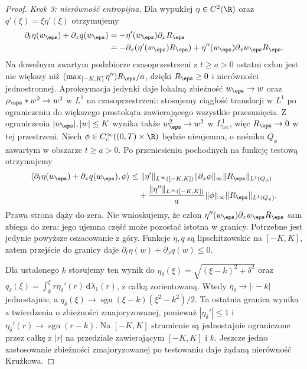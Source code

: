\begin{proof}
\emph{Krok 3: nierówność entropijna.}
Dla wypukłej $\eta\in C^2(\R)$ oraz
$q'(\xi)=\xi\eta'(\xi)$ otrzymujemy
\[
 \begin{split}
 \partial_t\eta(w_\eps)+\partial_xq(w_\eps)
 &=-\eta'(w_\eps)\partial_xR_\eps\\
 &=-\partial_x(\eta'(w_\eps)R_\eps)
       +\eta''(w_\eps)\partial_xw_\eps R_\eps.
 \end{split}
\]
Na dowolnym zwartym podzbiorze czasoprzestrzeni
z $t\ge a>0$ ostatni człon jest nie większy
niż $(\max_{[-K,K]}\eta'')R_\eps/a$, dzięki
$R_\eps\ge0$ i nierówności jednostronnej.
Aproksymacja jedynki daje lokalną zbieżność
$w_\eps\to w$ oraz $\rho_\eps*w^2\to w^2$
w $L^1$ na czasoprzestrzeni: stosujemy
ciągłość translacji w $L^1$ po ograniczeniu
do większego prostokąta zawierającego
wszystkie przesunięcia.
Z ograniczenia $|w_\eps|,|w|\le K$ wynika
także $w_\eps^2\to w^2$ w $L^1_{\mathrm{loc}}$,
więc $R_\eps\to0$ w tej przestrzeni.
Niech $\phi\in C_c^\infty((0,T)\times\R)$
będzie nieujemna, o nośniku $Q_\phi$ zawartym
w obszarze $t\ge a>0$. Po przeniesieniu pochodnych
na funkcję testową otrzymujemy
\[
 \begin{split}
 \langle\partial_t\eta(w_\eps)+\partial_xq(w_\eps),\phi\rangle
 &\le \|\eta'\|_{L^\infty([-K,K])}
         \|\partial_x\phi\|_\infty\|R_\eps\|_{L^1(Q_\phi)}\\
 &\quad+\frac{\|\eta''\|_{L^\infty([-K,K])}}{a}
         \|\phi\|_\infty\|R_\eps\|_{L^1(Q_\phi)}.
 \end{split}
\]
Prawa strona dąży do zera. Nie wnioskujemy,
że człon $\eta''(w_\eps)\partial_xw_\eps R_\eps$
sam zbiega do zera: jego ujemna część może
pozostać istotna w granicy. Potrzebne jest
jedynie powyższe oszacowanie z góry.
Funkcje $\eta,q$ są lipschitzowskie na $[-K,K]$,
zatem przejście do granicy daje
$\partial_t\eta(w)+\partial_xq(w)\le0$.

Dla ustalonego $k$ stosujemy ten wynik do
$\eta_\delta(\xi)=\sqrt{(\xi-k)^2+\delta^2}$ oraz
$q_\delta(\xi)=\int_k^\xi r\eta_\delta'(r)\,
\mathrm d\lambda_1(r)$, z całką zorientowaną.
Wtedy $\eta_\delta\to|\cdot-k|$ jednostajnie,
a $q_\delta(\xi)\to
\operatorname{sgn}(\xi-k)(\xi^2-k^2)/2$.
Ta ostatnia granica wynika z twierdzenia
o zbieżności zmajoryzowanej, ponieważ
$|\eta_\delta'|\le1$ i
$\eta_\delta'(r)\to\operatorname{sgn}(r-k)$.
Na $[-K,K]$ strumienie są jednostajnie
ograniczone przez całkę z $|r|$ na przedziale
zawierającym $[-K,K]$ i $k$.
Jeszcze jedno zastosowanie zbieżności
zmajoryzowanej po testowaniu daje żądaną
nierówność Krużkowa.


\end{proof}
